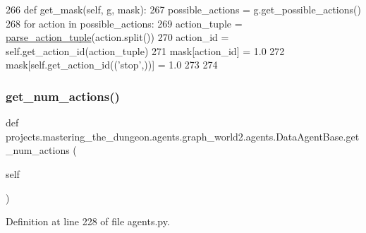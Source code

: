 \begin{DoxyCode}
266     \textcolor{keyword}{def }get\_mask(self, g, mask):
267         possible\_actions = g.get\_possible\_actions()
268         \textcolor{keywordflow}{for} action \textcolor{keywordflow}{in} possible\_actions:
269             action\_tuple = \hyperlink{namespaceprojects_1_1mastering__the__dungeon_1_1agents_1_1graph__world2_1_1agents_a11c98f469df4fb4ecb640c91544dfe26}{parse\_action\_tuple}(action.split())
270             action\_id = self.get\_action\_id(action\_tuple)
271             mask[action\_id] = 1.0
272         mask[self.get\_action\_id((\textcolor{stringliteral}{'stop'},))] = 1.0
273 
274 
\end{DoxyCode}
\mbox{\label{classprojects_1_1mastering__the__dungeon_1_1agents_1_1graph__world2_1_1agents_1_1DataAgentBase_a5b21ce4807ee5540c2a36534fdc91bd2}} 
\subsubsection{\texorpdfstring{get\+\_\+num\+\_\+actions()}{get\_num\_actions()}}
{\footnotesize\ttfamily def projects.\+mastering\+\_\+the\+\_\+dungeon.\+agents.\+graph\+\_\+world2.\+agents.\+Data\+Agent\+Base.\+get\+\_\+num\+\_\+actions (\begin{DoxyParamCaption}\item[{}]{self }\end{DoxyParamCaption})}



Definition at line 228 of file agents.\+py.


